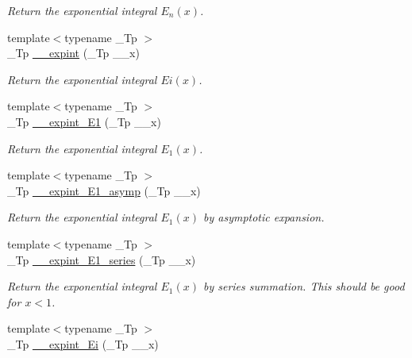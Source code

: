 \begin{DoxyCompactItemize}
\begin{DoxyCompactList}\small\item\em Return the exponential integral $ E_n(x) $. \end{DoxyCompactList}\item 
{\footnotesize template$<$typename \+\_\+\+Tp $>$ }\\\+\_\+\+Tp \hyperlink{namespacestd_1_1____detail_abefd4102ce8a673604204e360074ceaa}{\+\_\+\+\_\+expint} (\+\_\+\+Tp \+\_\+\+\_\+x)
\begin{DoxyCompactList}\small\item\em Return the exponential integral $ Ei(x) $. \end{DoxyCompactList}\item 
{\footnotesize template$<$typename \+\_\+\+Tp $>$ }\\\+\_\+\+Tp \hyperlink{namespacestd_1_1____detail_a665eb0c524b929c035d88bbb17815917}{\+\_\+\+\_\+expint\+\_\+\+E1} (\+\_\+\+Tp \+\_\+\+\_\+x)
\begin{DoxyCompactList}\small\item\em Return the exponential integral $ E_1(x) $. \end{DoxyCompactList}\item 
{\footnotesize template$<$typename \+\_\+\+Tp $>$ }\\\+\_\+\+Tp \hyperlink{namespacestd_1_1____detail_abd02a300cd209be618a6e054a706c012}{\+\_\+\+\_\+expint\+\_\+\+E1\+\_\+asymp} (\+\_\+\+Tp \+\_\+\+\_\+x)
\begin{DoxyCompactList}\small\item\em Return the exponential integral $ E_1(x) $ by asymptotic expansion. \end{DoxyCompactList}\item 
{\footnotesize template$<$typename \+\_\+\+Tp $>$ }\\\+\_\+\+Tp \hyperlink{namespacestd_1_1____detail_ad162f66405bde5ccd5a7cdabbe1966f7}{\+\_\+\+\_\+expint\+\_\+\+E1\+\_\+series} (\+\_\+\+Tp \+\_\+\+\_\+x)
\begin{DoxyCompactList}\small\item\em Return the exponential integral $ E_1(x) $ by series summation. This should be good for $ x < 1 $. \end{DoxyCompactList}\item 
{\footnotesize template$<$typename \+\_\+\+Tp $>$ }\\\+\_\+\+Tp \hyperlink{namespacestd_1_1____detail_ab2f8bf37caa4993de28306a2a634ed6f}{\+\_\+\+\_\+expint\+\_\+\+Ei} (\+\_\+\+Tp \+\_\+\+\_\+x)

\end{DoxyCompactItemize}
